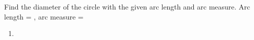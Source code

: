 Find the diameter of the circle with the given arc length and arc measure.
\newline
Arc length = , arc measure = \degree
\newline
\begin{enumerate}
    \item
    \degree
{}
\end{enumerate}

